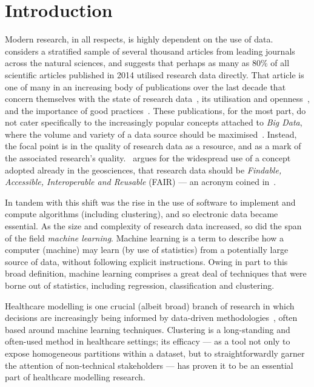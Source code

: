 \section{Introduction}\label{sec:intro}

Modern research, in all respects, is highly dependent on the use of
data.~\cite{Womack2015} considers a stratified sample of several thousand
articles from leading journals across the natural sciences, and suggests that
perhaps as many as 80\% of all scientific articles published in 2014 utilised
research data directly. That article is one of many in an increasing body of
publications over the last decade that concern themselves with the state of
research data~\cite{Higman2019}, its utilisation and
openness~\cite{Aslam2017,Zuiderwijk2020}, and the importance of good  %
practices~\cite{Colavizza2020,Corti2019}. These publications, for the most part,
do not cater specifically to the increasingly popular concepts attached to
\emph{Big Data}, where the volume and variety of a data source should be  %
maximised~\cite{Batisti2019}. Instead, the focal point is in the quality of
research data as a resource, and as a mark of the associated research's
quality.~\cite{Stall2019} argues for the widespread use of a concept adopted
already in the geosciences, that research data should be \emph{Findable,
Accessible, Interoperable and Reusable} (FAIR) --- an acronym coined
in~\cite{Wilkinson2016}.

In tandem with this shift was the rise in the use of software to implement and
compute algorithms (including clustering), and so electronic data became
essential. As the size and complexity of research data increased, so did the
span of the field \emph{machine learning}. Machine learning is a term to
describe how a computer (machine) may learn (by use of statistics) from a
potentially large source of data, without following explicit instructions. Owing
in part to this broad definition, machine learning comprises a great deal of
techniques that were borne out of statistics, including regression,
classification and clustering.

Healthcare modelling is one crucial (albeit broad) branch of research in which
decisions are increasingly being informed by data-driven
methodologies~\cite{Alexander2018,Belle2015,RiosZertuche2020}, often based
around machine learning techniques. Clustering is a long-standing and often-used
method in healthcare settings; its efficacy --- as a tool not only to expose
homogeneous partitions within a dataset, but to straightforwardly garner the
attention of non-technical stakeholders --- has proven it to be an essential
part of healthcare modelling research.

